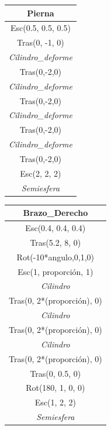 \documentclass{article}
\begin{document}
\begin{table}[h!]
	\centering
	\label{5}
	\begin{tabular}{|c|}
		\hline
		\textbf{Pierna}\\ \hline
		Esc(0.5, 0.5, 0.5)\\ \hline
		Tras(0, -1, 0)\\ \hline
		\textit{Cilindro\_deforme}\\ \hline
		Tras(0,-2,0)\\ \hline
		\textit{Cilindro\_deforme}\\ \hline
		Tras(0,-2,0)\\ \hline
		\textit{Cilindro\_deforme}\\ \hline
		Tras(0,-2,0)\\ \hline
		\textit{Cilindro\_deforme}\\ \hline
		Tras(0,-2,0)\\ \hline
		Esc(2, 2, 2)\\ \hline
		\textit{Semiesfera}\\ \hline
	\end{tabular}
\end{table}

\begin{table}[h!]
	\centering
	\label{6}
	\begin{tabular}{|c|}
		\hline
		\textbf{Brazo\_Derecho}\\ \hline
		Esc(0.4, 0.4, 0.4)\\ \hline
		Tras(5.2, 8, 0)\\ \hline
		Rot(-10*angulo,0,1,0)\\ \hline
		Esc(1, proporción, 1)\\ \hline
		\textit{Cilindro}\\ \hline
		Tras(0, 2*(proporción), 0)\\ \hline
		\textit{Cilindro}\\ \hline
		Tras(0, 2*(proporción), 0)\\ \hline
		\textit{Cilindro}\\ \hline
		Tras(0, 2*(proporción), 0)\\ \hline
		Tras(0, 0.5, 0)\\ \hline
		Rot(180, 1, 0, 0)\\ \hline
		Esc(1, 2, 2)\\ \hline
		\textit{Semiesfera}\\ \hline
	\end{tabular}
\end{table}
\end{document}

